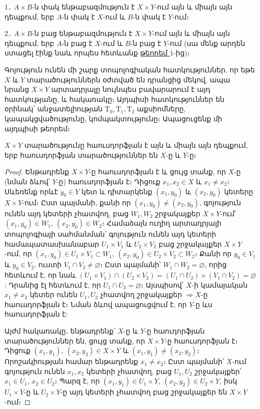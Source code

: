 \documentclass[./main.tex]{subfiles}
\begin{document}
\begin{hetevanq6}\label{ch13cor2}
1․ $A\times B$-ն փակ ենթաբազմություն է $X\times Y$-ում այն և միայն այն դեպքում, երբ $A$-ն փակ է $X$-ում և $B$-ն փակ է $Y$-ում։
\par 2․ $A\times B$-ն բաց ենթաբազմություն է $X\times Y$-ում այն և միայն այն դեպքում, երբ $A$-ն բաց է $X$-ում և $B$-ն բաց է $Y$-ում (սա մենք արդեն ստացել էինք նաև որպես հետևանք \hyperref[թեորեմ $1$]{թեորեմ $1$}-ից)։
\end{hetevanq6}
\par Գոյություն ունեն մի շարք տոպոլոգիական հատկություններ, որ եթե $X$ և $Y$ տա\-րա\-ծություններն օժտված են դրանցից մեկով, ապա նրանց $X\times Y$ արտադրյալը նույնպես բավարարում է այդ հատկությանը, և հակառակը։ Այդպիսի հատկություն\-ներ են օրինակ՝ անջատելիության $\textrm{T}_0,\textrm{T}_1,\textrm{T}_2$ աքսիոմները, կապակցվածությունը, կոմ\-պակտու\-թյունը։ Ապացուցենք մի այդպիսի թեորեմ։
\begin{theorem}\label{ch13thm7}
$X\times Y$ տարածությունը հաուսդորֆյան է այն և միայն այն դեպքում, երբ հաուսդորֆյան տարածություններ են $X$-ը և $Y$-ը։ 
\end{theorem}
\begin{proof}
Ենթադրենք $X\times Y$-ը հաուսդորֆյան է և ցույց տանք, որ $X$-ը (նման ձևով՝ $Y$-ը) հաուսդորֆյան է։ Դիցուք $x_1,x_2\in X$ և $x_1\neq x_2$։ Սևեռենք որևէ $y_0\in Y$ կետ և դիտարկենք $(x_1,y_0)$ և $(x_2,y_0)$ կետերը $X\times Y$-ում։ Ըստ պայմանի, քանի որ $(x_1,y_0)\neq (x_2,y_0)$, գոյություն ունեն այդ կետերի չհատվող, բաց $W_1,W_2$ շրջակայքեր $X\times Y$-ում՝ $(x_1,y_0)\in W_1,\ (x_2,y_0)\in W_2$։ Համաձայն ուղիղ արտադրյալի տոպոլոգիայի սահմանման՝ գոյություն ունեն այդ կետերի համապատասխանաբար $U_1\times V_1$ և $U_2\times V_2$ բաց շրջակայքեր $X\times Y$-ում, որ $(x_1,y_0)\in U_1\times V_1\subset W_1,\ (x_2,y_0)\in U_2\times V_2\subset W_2$։ Քանի որ $y_0\in V_1$ և $y_0\in V_2$, ուստի $V_1\cap V_2\neq \varnothing$։ Ըստ պայմանի՝ $W_1\cap W_2=\varnothing$, որից հետևում է, որ նաև $(U_1\times V_1 )\cap (U_2\times V_2 )=(U_1\cap U_2 )\times (V_1\cap V_2 )=\varnothing$: Դրանից էլ հետևում է, որ $U_1\cap U_2=\varnothing$։ Այսպիսով՝ $X$-ի կամայական $x_1\neq x_2$ կետեր ունեն $U_1,U_2$ չհատվող շրջակայքեր $\Rightarrow X$-ը հաուսդորֆյան է։ Նման ձևով ապացուցվում է, որ $Y$-ը ևս հաուսդորֆյան է:
\par Այժմ հակառակը․ ենթադրենք՝ $X$-ը և $Y$-ը հաուդորֆյան տարածություններ են, ցույց տանք, որ $X\times Y$-ը հաուսդորֆյան է։ Դիցուք $(x_1,y_1),\ (x_2,y_2)\in X\times Y $ և $(x_1,y_1)\neq (x_2,y_2)$։ Որոշակիության համար ենթադրենք $x_1\neq x_2$։ Ըստ պայմանի՝ $X\textrm{-ում}$ գոյություն ունեն $x_1, x_2$ կետերի չհատվող, բաց $U_1,U_2$ շրջակայքեր՝ ${x_1\in U_1}$, $x_2\in U_2$։ Պարզ է, որ $(x_1,y_1)\in U_1\times Y,\ (x_2,y_2)\in U_2\times Y$, իսկ $U_1\times Y$-ը և $U_2\times Y$-ը այդ կետերի չհատվող բաց շրջակայքեր են $X\times Y$-ում։
\end{proof}
\end{document}
